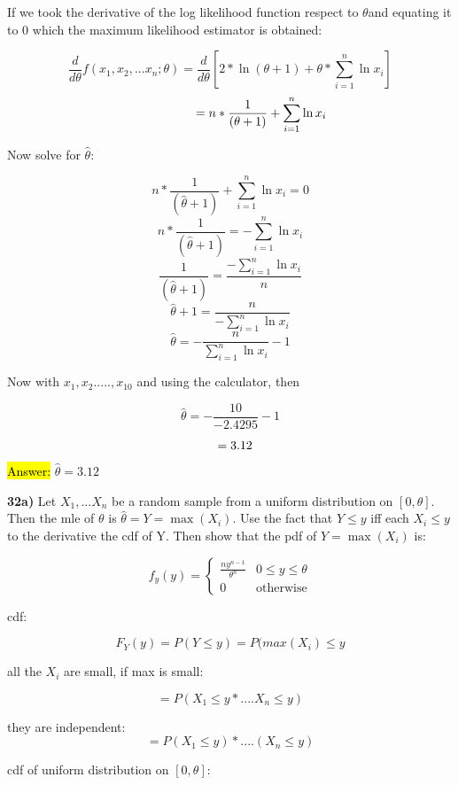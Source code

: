 \documentclass{article}
\begin{document}
If we took the derivative of the log likelihood function respect to $\theta$and equating it to 0 which the maximum likelihood estimator is obtained:

$$\frac{d}{d\theta}f(x_{1}, x_{2},... x_{n}; \theta)=\frac{d}{d\theta}[2 * \ln(\theta+1) + \theta* \sum_{i=1}^{n}  \ln  x_{i}]$$
$$\hspace{.7in}=n*\frac{1}{(\theta+1)}+\sum_{i=1}^{n}  \ln  x_{i}$$

Now solve for $\hat{\theta}$: 

$$n*\frac{1}{(\hat{\theta}+1)}+\sum_{i=1}^{n}  \ln  x_{i}=0$$
$$n*\frac{1}{(\hat{\theta}+1)}=-\sum_{i=1}^{n}  \ln  x_{i}$$
$$\frac{1}{(\hat{\theta}+1)}=\frac{-\sum_{i=1}^{n}  \ln  x_{i}}{n}$$
$$\hat{\theta}+1=\frac{n}{-\sum_{i=1}^{n}  \ln  x_{i}}$$
$$\hat{\theta}=-\frac{n}{\sum_{i=1}^{n}  \ln  x_{i}}-1$$
\vspace{2mm}

Now with $x_{1}, x_{2}.....,x_{10}$ and using the calculator, then

$$\hat{\theta}=-\frac{10}{-2.4295} -1$$


$$\hspace{.11in}=3.12$$

\begin{center}
\hl{Answer:} $\hat{\theta}=3.12$
\end{center}


\newpage

\textbf{32a)} Let $X_{1},...X_{n}$ be a random sample from a uniform distribution on $[0,\theta]$. Then the mle of       $\theta$ is $\hat{\theta}=Y=\max(X_{i})$. Use the fact that $Y \le y$ iff each $X_{i} \le y$ to the derivative the cdf of Y. Then show that the pdf of $Y=\max(X_{i})$ is: 

 $$f_{y}(y)=
\begin{cases}
 \frac{ny^{n-1}}{\theta^{n}} & 0\le y \le \theta \\
 0 & \text{otherwise} 
\end{cases}$$ 

cdf:

$$F_{Y}(y)=P(Y \le y)=P(max(X_{i}) \le y$$

all the $X_{i}$ are small, if max is small:

$$=P(X_{1} \le y *....X_{n} \le y)$$

they are independent:
$$=P(X_{1} \le y) *....(X_{n} \le y)$$

cdf of uniform distribution on $[0,\theta]$:
\end{document}
